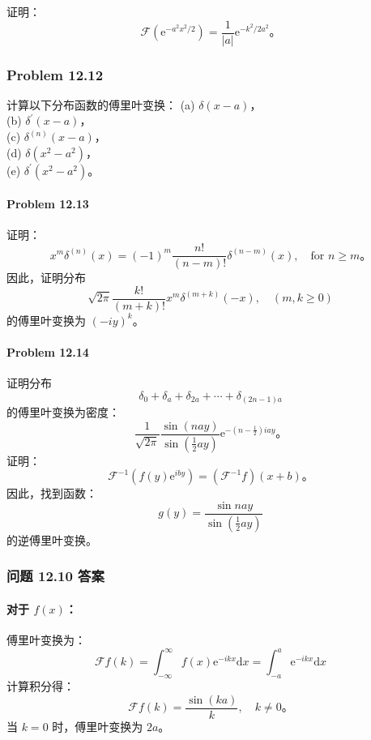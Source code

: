 证明：
 $$
\mathcal{F}\left(\mathrm{e}^{-a^{2} x^{2} / 2}\right) = \frac{1}{|a|} \mathrm{e}^{-k^{2} / 2 a^{2}}。
$$
\subsubsection{Problem 12.12}\label{problem-12.12}

计算以下分布函数的傅里叶变换： (a) $\delta(x-a)$，\\
(b) $\delta^{\prime}(x-a)$，\\
(c) $\delta^{(n)}(x-a)$，\\
(d) $\delta\left(x^{2}-a^{2}\right)$，\\
(e) $\delta^{\prime}\left(x^{2}-a^{2}\right)$。

\paragraph{Problem 12.13}\label{problem-12.13}

证明：
 $$
x^{m} \delta^{(n)}(x) = (-1)^{m} \frac{n!}{(n-m)!} \delta^{(n-m)}(x), \quad \text{for } n \geq m。
$$
因此，证明分布
 $$
\sqrt{2 \pi} \frac{k!}{(m+k)!} x^{m} \delta^{(m+k)}(-x), \quad (m, k \geq 0)
$$
的傅里叶变换为 $(-i y)^{k}$。

\paragraph{Problem 12.14}\label{problem-12.14}

证明分布
 $$
\delta_{0} + \delta_{a} + \delta_{2 a} + \cdots + \delta_{(2 n-1) a}
$$
的傅里叶变换为密度：
 $$
\frac{1}{\sqrt{2 \pi}} \frac{\sin (n a y)}{\sin \left(\frac{1}{2} a y\right)} \mathrm{e}^{-\left(n-\frac{1}{2}\right) i a y}。
$$
证明：
 $$
\mathcal{F}^{-1}\left(f(y) \mathrm{e}^{i b y}\right) = \left(\mathcal{F}^{-1} f\right)(x+b)。
$$
因此，找到函数：
 $$
g(y) = \frac{\sin n a y}{\sin \left(\frac{1}{2} a y\right)}
$$
的逆傅里叶变换。

\subsubsection{问题 12.10 答案}\label{ux95eeux9898-12.10-ux7b54ux6848}

\paragraph{\texorpdfstring{对于
$f(x)$：}{对于 f(x)：}}\label{ux5bf9ux4e8e-fx}

傅里叶变换为：
 $$
\mathcal{F}f(k) = \int_{-\infty}^\infty f(x) \mathrm{e}^{-i k x} \mathrm{d}x = \int_{-a}^a \mathrm{e}^{-i k x} \mathrm{d}x
$$
计算积分得：
 $$
\mathcal{F}f(k) = \frac{\sin(ka)}{k}, \quad k \neq 0。
$$
当 $k = 0$ 时，傅里叶变换为 $2a$。

